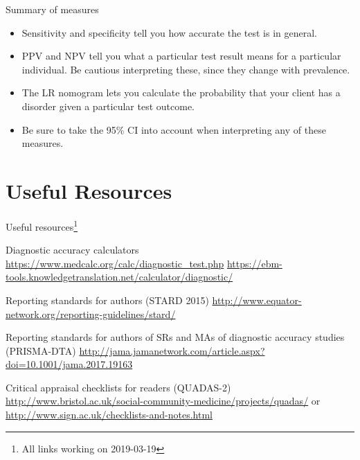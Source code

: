 \documentclass{beamer}
\begin{document}

\begin{frame}{Summary of measures}
	\begin{itemize}
	\item Sensitivity and specificity tell you how accurate the test is in general. 
	\item PPV and NPV tell you what a particular test result means for a particular individual. Be cautious interpreting these, since they change with prevalence.
	\item The LR nomogram lets you calculate the probability that your client has a disorder given a particular test outcome.
	\item Be sure to take the 95\% CI into account when interpreting any of these measures.
	\end{itemize}
\end{frame}

\section{Useful Resources}

\begin{frame}{Useful resources\footnote{\tiny{All links working on 2019-03-19}}}
	\begin{block}{Diagnostic accuracy calculators}
	\footnotesize{
	\url{https://www.medcalc.org/calc/diagnostic_test.php}
	\url{https://ebm-tools.knowledgetranslation.net/calculator/diagnostic/}
	}
	\end{block}
	
	\begin{block}{Reporting standards for authors (STARD 2015)}
	\footnotesize{
	\url{http://www.equator-network.org/reporting-guidelines/stard/}
	}
	\end{block}

	\begin{block}{Reporting standards for authors of SRs and MAs of diagnostic accuracy studies (PRISMA-DTA)}
	\footnotesize{
	\url{http://jama.jamanetwork.com/article.aspx?doi=10.1001/jama.2017.19163}
	}
	\end{block}
	
	\begin{block}{Critical appraisal checklists for readers (QUADAS-2)}
\footnotesize{
	\url{http://www.bristol.ac.uk/social-community-medicine/projects/quadas/} or 
	\url{http://www.sign.ac.uk/checklists-and-notes.html}
	}
	\end{block}
\end{frame}
\end{document}
